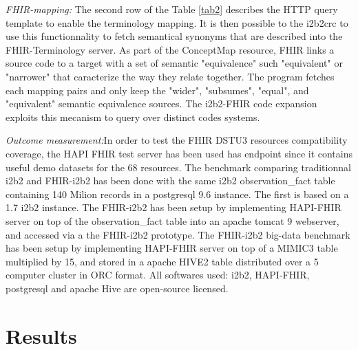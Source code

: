 \documentclass{amia}
\begin{document}
\textit{FHIR-mapping:} The second row of the Table \ref{tab2} describes the HTTP query template to enable the terminology mapping. It is then possible to the i2b2crc to use this functionnality to fetch semantical synonyms that are described into the FHIR-Terminology server. As part of the ConceptMap\cite{ref15} resource, FHIR links a source code to a target with a set of semantic "equivalence" such "equivalent" or "narrower" that caracterize the way they relate together. The program fetches each mapping pairs and only keep the "wider", "subsumes", "equal", and "equivalent" semantic equivalence sources. The i2b2-FHIR code expansion exploits this mecanism to query over distinct codes systems.



\textit{Outcome measurement:}In order to test the FHIR DSTU3 resources compatibility coverage, the HAPI FHIR test server has been used has endpoint since it contains useful demo datasets for the 68 resources. The benchmark comparing traditionnal i2b2 and FHIR-i2b2 has been done with the same i2b2 observation\_fact table containing 140 Milion records in a postgresql 9.6 instance. The first is based on a 1.7 i2b2 instance. The FHIR-i2b2 has been setup by implementing HAPI-FHIR server on top of the observation\_fact table into an apache tomcat 9 webserver, and accessed via a the FHIR-i2b2 prototype. The FHIR-i2b2 big-data benchmark has been setup by implementing HAPI-FHIR server on top of a MIMIC3\cite{ref17} table multiplied by 15, and stored in a apache HIVE2 table distributed over a 5 computer cluster in ORC format.
All softwares used: i2b2, HAPI-FHIR, postgresql and apache Hive are open-source licensed.

\section*{Results}
\end{document}
